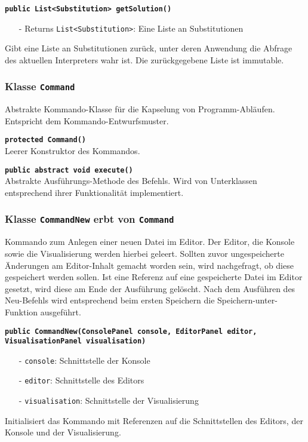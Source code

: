 \documentclass[parskip=full,11pt,twoside]{scrartcl}
\begin{document}
\textbf{\texttt{public List<Substitution> getSolution()}}
\begin{itemize}[noitemsep]
    \item[-] Returns \texttt{List<Substitution>}: Eine Liste an Substitutionen
\end{itemize}
Gibt eine Liste an Substitutionen zurück, unter deren Anwendung die Abfrage des aktuellen Interpreters wahr ist. Die zurückgegebene Liste ist immutable.

\subsubsection{Klasse \texttt{Command}}

Abstrakte Kommando-Klasse für die Kapselung von Programm-Abläufen. Entspricht dem Kommando-Entwurfsmuster.

\textbf{\texttt{protected Command()}}\\
Leerer Konstruktor des Kommandos.

\textbf{\texttt{public abstract void execute()}}\\
Abstrakte Ausführungs-Methode des Befehls. Wird von Unterklassen entsprechend ihrer Funktionalität implementiert.

\subsubsection{Klasse \texttt{CommandNew} erbt von \texttt{Command}}

Kommando zum Anlegen einer neuen Datei im Editor. Der Editor, die Konsole sowie die Visualisierung werden hierbei geleert. Sollten zuvor ungespeicherte Änderungen am Editor-Inhalt gemacht worden sein, wird nachgefragt, ob diese gespeichert werden sollen. Ist eine Referenz auf eine gespeicherte Datei im Editor gesetzt, wird diese am Ende der Ausführung gelöscht. Nach dem Ausführen des Neu-Befehls wird entsprechend beim ersten Speichern die Speichern-unter-Funktion ausgeführt.

\textbf{\texttt{public CommandNew(ConsolePanel console, EditorPanel editor,\\VisualisationPanel visualisation)}}
\begin{itemize}[noitemsep]
	\item[-] \texttt{console}: Schnittstelle der Konsole
	\item[-] \texttt{editor}: Schnittstelle des Editors
	\item[-] \texttt{visualisation}: Schnittstelle der Visualisierung
\end{itemize}
Initialisiert das Kommando mit Referenzen auf die Schnittstellen des Editors, der Konsole und der Visualisierung.
\end{document}
